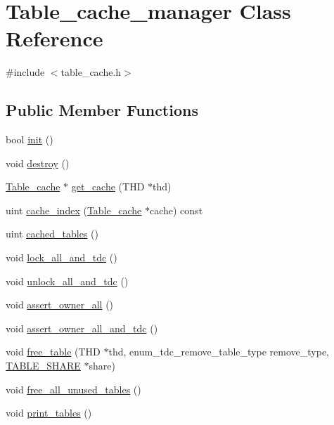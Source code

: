 \hypertarget{classTable__cache__manager}{}\section{Table\+\_\+cache\+\_\+manager Class Reference}
\label{classTable__cache__manager}


{\ttfamily \#include $<$table\+\_\+cache.\+h$>$}

\subsection*{Public Member Functions}
\begin{DoxyCompactItemize}
\item 
bool \mbox{\hyperlink{classTable__cache__manager_a418d8fa95acd7c7fd3330f4244cec571}{init}} ()
\item 
void \mbox{\hyperlink{classTable__cache__manager_af0e8904eae6270f9ec839d5dadba5460}{destroy}} ()
\item 
\mbox{\hyperlink{classTable__cache}{Table\+\_\+cache}} $\ast$ \mbox{\hyperlink{classTable__cache__manager_a39f254e5a07c0c99075b95042a4f211c}{get\+\_\+cache}} (T\+HD $\ast$thd)
\item 
uint \mbox{\hyperlink{classTable__cache__manager_a5aa3dcefb425c91c695456c1a2d38336}{cache\+\_\+index}} (\mbox{\hyperlink{classTable__cache}{Table\+\_\+cache}} $\ast$cache) const
\item 
uint \mbox{\hyperlink{classTable__cache__manager_a0e81e3a9951b143cb8c721b37c9dcd0e}{cached\+\_\+tables}} ()
\item 
void \mbox{\hyperlink{classTable__cache__manager_a2b8e9bbb39f7c6b948fdf47846627a22}{lock\+\_\+all\+\_\+and\+\_\+tdc}} ()
\item 
void \mbox{\hyperlink{classTable__cache__manager_a1060948378f39f0423fcad3bdf6ce5fd}{unlock\+\_\+all\+\_\+and\+\_\+tdc}} ()
\item 
void \mbox{\hyperlink{classTable__cache__manager_a76f632068e35751f33f55411782ec0f5}{assert\+\_\+owner\+\_\+all}} ()
\item 
void \mbox{\hyperlink{classTable__cache__manager_a37f16e870f09121bf23aba37052cab5a}{assert\+\_\+owner\+\_\+all\+\_\+and\+\_\+tdc}} ()
\item 
void \mbox{\hyperlink{classTable__cache__manager_ab52f0773a6d18d64609aa52e042ce4dc}{free\+\_\+table}} (T\+HD $\ast$thd, enum\+\_\+tdc\+\_\+remove\+\_\+table\+\_\+type remove\+\_\+type, \mbox{\hyperlink{structTABLE__SHARE}{T\+A\+B\+L\+E\+\_\+\+S\+H\+A\+RE}} $\ast$share)
\item 
void \mbox{\hyperlink{classTable__cache__manager_a8b9f94963366a5384895a9fff85c3f7e}{free\+\_\+all\+\_\+unused\+\_\+tables}} ()
\item 
void \mbox{\hyperlink{classTable__cache__manager_a1ceca2228f370630706bb12c74decf40}{print\+\_\+tables}} ()
\end{DoxyCompactItemize}
